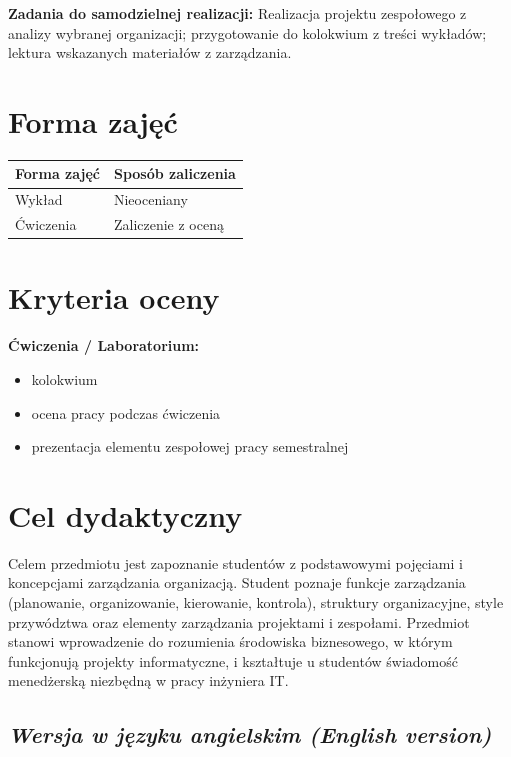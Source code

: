 \documentclass[12pt, a4paper]{article}
\newcommand{\thdrule}{\noalign{\global\setlength{\extrarowheight}{0pt}}}
\newcommand{\thdend}{\noalign{\global\setlength{\extrarowheight}{3pt}}}
\begin{document}
\vspace{4pt}
\noindent\textbf{Zadania do samodzielnej realizacji:} Realizacja projektu zespołowego z analizy wybranej organizacji; przygotowanie do kolokwium z treści wykładów; lektura wskazanych materiałów z zarządzania.

\section{Forma zajęć}

\begin{center}
{\scriptsize
\begin{tabular}{m{5cm}m{8cm}}
\thdrule\toprule
\rowcolor{pjatkRed} {\color{white}\textbf{Forma zajęć}} & {\color{white}\textbf{Sposób zaliczenia}} \\
\midrule\thdend
  \rowcolor{tableRowLight} Wykład & Nieoceniany \\
  \rowcolor{tableRowAlt} Ćwiczenia & Zaliczenie z oceną \\
\bottomrule
\end{tabular}}
\end{center}

\section{Kryteria oceny}

\textbf{Ćwiczenia / Laboratorium:}
\begin{itemize}
  \item kolokwium
  \item ocena pracy podczas ćwiczenia
  \item prezentacja elementu zespołowej pracy semestralnej
\end{itemize}


\section{Cel dydaktyczny}

Celem przedmiotu jest zapoznanie studentów z podstawowymi pojęciami i koncepcjami zarządzania organizacją. Student poznaje funkcje zarządzania (planowanie, organizowanie, kierowanie, kontrola), struktury organizacyjne, style przywództwa oraz elementy zarządzania projektami i zespołami. Przedmiot stanowi wprowadzenie do rozumienia środowiska biznesowego, w którym funkcjonują projekty informatyczne, i kształtuje u studentów świadomość menedżerską niezbędną w pracy inżyniera IT.

\subsection*{\textit{Wersja w języku angielskim (English version)}}
\end{document}
